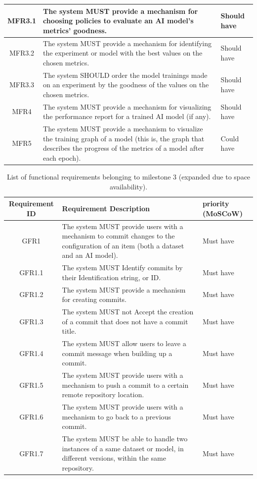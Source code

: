 \begin{longtable}{| c | p{9cm} | p{3cm} |}
    MFR3.1   & The system MUST provide a mechanism for choosing policies to evaluate an AI model's metrics' goodness. & Should have \\ \hline
    MFR3.2   & The system MUST provide a mechanism for identifying the experiment or model with the best values on the chosen metrics. & Should have \\ \hline
    MFR3.3   & The system SHOULD order the model trainings made on an experiment by the goodness of the values on the chosen metrics. & Should have \\ \hline
    MFR4     & The system MUST provide a mechanism for visualizing the performance report for a trained AI model (if any). & Should have \\ \hline
    MFR5     & The system MUST provide a mechanism to visualize the training graph of a model (this is, the graph that describes the progress of the metrics of a model after each epoch). & Could have \\ \hline
\end{longtable}


\begin{table}[H]
	\centering
	\caption{List of functional requirements belonging to milestone 3 (expanded due to space availability).}
	\label{tab:requirementsMilestone3}
	\begin{tabular}{ | c | p{9cm} | p{3cm} |}
		\hline
		\textbf{Requirement ID} & \textbf{Requirement Description} & \textbf{priority (MoSCoW)} \\ \hline
        GFR1     & The system MUST provide users with a mechanism to commit changes to the configuration of an item (both a dataset and an AI model).   & Must have \\ \hline
        GFR1.1   & The system MUST Identify commits by their Identification string, or ID.   & Must have \\ \hline
        GFR1.2   & The system MUST provide a mechanism for creating commits.   & Must have \\ \hline
        GFR1.3   & The system MUST not Accept the creation of a commit that does not have a commit title.    & Must have\\ \hline
        GFR1.4   & The system MUST allow users to leave a commit message when building up a commit.    & Must have\\ \hline
        GFR1.5   & The system MUST provide users with a mechanism to push a commit to a certain remote repository location.    & Must have\\ \hline
        GFR1.6   & The system MUST provide users with a mechanism to go back to a previous commit.    & Must have\\ \hline
        GFR1.7   & The system MUST be able to handle two instances of a same dataset or model, in different versions, within the same repository.    & Must have\\ \hline
	\end{tabular}
\end{table}

